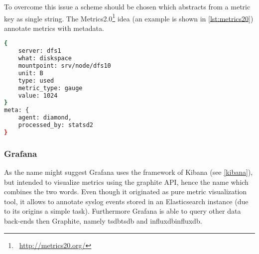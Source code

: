 To overcome this issue a scheme should be chosen which abstracts from a metric key as single string.
The Metrics2.0\footnote{\Mundus~\url{http://metrics20.org/}} idea (an example is shown in \autoref{lst:metrics20}) annotate metrics with metadata.

\begin{lstlisting}[language=bash,
    caption={Metrics2.0 formatted metric},
    label={lst:metrics20}]
{
    server: dfs1
    what: diskspace
    mountpoint: srv/node/dfs10
    unit: B
    type: used
    metric_type: gauge
    value: 1024
}
meta: {
    agent: diamond,
    processed_by: statsd2
}
\end{lstlisting}

\subsubsection{Grafana}
As the name might suggest Grafana uses the framework of Kibana (see \ref{kibana}), but intended to visualize metrics using the \gls{graphite} API, hence the name which combines the two words.
Even though it originated as pure metric visualization tool, it allows to annotate syslog events stored in an Elasticsearch instance (due to its origins a simple task).
Furthermore Grafana is able to query other data back-ends then Graphite, namely \gls{tsdb}\glsdesc{tsdb} and \gls{influxdb}\glsdesc{influxdb}.